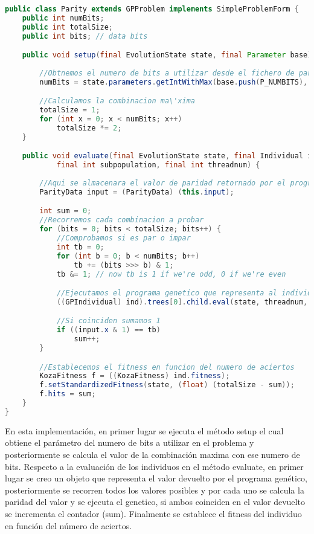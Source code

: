 \begin{lstlisting}[language=Java]
public class Parity extends GPProblem implements SimpleProblemForm {
	public int numBits;
	public int totalSize;
	public int bits; // data bits

	public void setup(final EvolutionState state, final Parameter base) {
		
		//Obtnemos el numero de bits a utilizar desde el fichero de parametros
		numBits = state.parameters.getIntWithMax(base.push(P_NUMBITS), null, 2, 31);

		//Calculamos la combinacion ma\'xima
		totalSize = 1;
		for (int x = 0; x < numBits; x++)
			totalSize *= 2;
	}

	public void evaluate(final EvolutionState state, final Individual ind,
			final int subpopulation, final int threadnum) {
		
		//Aqui se almacenara el valor de paridad retornado por el programa gen\'etico
		ParityData input = (ParityData) (this.input);

		int sum = 0;
		//Recorremos cada combinacion a probar
		for (bits = 0; bits < totalSize; bits++) {		
			//Comprobamos si es par o impar
			int tb = 0;
			for (int b = 0; b < numBits; b++)
				tb += (bits >>> b) & 1;
			tb &= 1; // now tb is 1 if we're odd, 0 if we're even

			//Ejecutamos el programa genetico que representa al individuo
			((GPIndividual) ind).trees[0].child.eval(state, threadnum, input, stack, ((GPIndividual) ind), this);

			//Si coinciden sumamos 1
			if ((input.x & 1) == tb)
				sum++;
		}

		//Establecemos el fitness en funcion del numero de aciertos
		KozaFitness f = ((KozaFitness) ind.fitness);
		f.setStandardizedFitness(state, (float) (totalSize - sum));
		f.hits = sum;
	}
}
\end{lstlisting}

En esta implementación, en primer lugar se ejecuta el método setup el cual obtiene el parámetro del numero de bits a utilizar en el problema y posteriormente se calcula el valor de la combinación maxima con ese numero de bits. Respecto a la evaluación de los individuos en el método evaluate, en primer lugar se creo un objeto que representa el valor devuelto por el programa genético, posteriormente se recorren todos los valores posibles y por cada uno se calcula la paridad del valor y se ejecuta el genetico, si ambos coinciden en el valor devuelto se incrementa el contador (sum). Finalmente se establece el fitness del individuo en funci\'on del n\'umero de aciertos.

